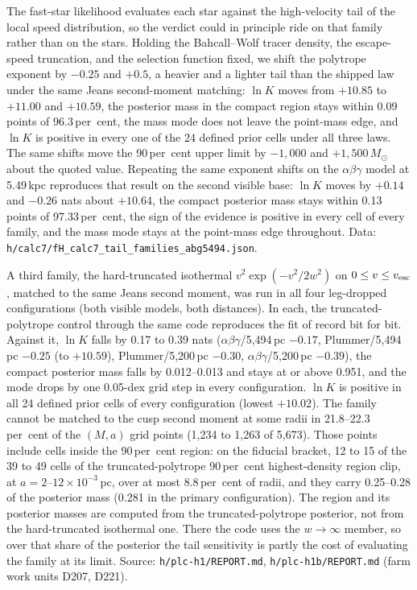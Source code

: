 \documentclass[11pt]{article}
\newcommand{\msun}{\ensuremath{M_\odot}}
\newcommand{\lnK}{\ensuremath{\ln K}}
\begin{document}
The fast-star likelihood evaluates each star against the high-velocity tail of the local speed distribution, so the verdict could in principle ride on that family rather than on the stars. Holding the Bahcall--Wolf tracer density, the escape-speed truncation, and the selection function fixed, we shift the polytrope exponent by $-0.25$ and $+0.5$, a heavier and a lighter tail than the shipped law under the same Jeans second-moment matching: $\lnK$ moves from $+10.85$ to $+11.00$ and $+10.59$, the posterior mass in the compact region stays within 0.09 points of 96.3\,per~cent, the mass mode does not leave the point-mass edge, and $\lnK$ is positive in every one of the 24 defined prior cells under all three laws. The same shifts move the 90\,per~cent upper limit by $-1{,}000$ and $+1{,}500\,\msun$ about the quoted value. Repeating the same exponent shifts on the $\alpha\beta\gamma$ model at 5.49\,kpc reproduces that result on the second visible base: $\lnK$ moves by $+0.14$ and $-0.26$ nats about $+10.64$, the compact posterior mass stays within 0.13 points of 97.33\,per~cent, the sign of the evidence is positive in every cell of every family, and the mass mode stays at the point-mass edge throughout. Data: \texttt{h/calc7/fH\_calc7\_tail\_families\_abg5494.json}.

A third family, the hard-truncated isothermal $v^{2}\exp(-v^{2}/2w^{2})$ on $0\le v\le v_{\rm esc}$, matched to the same Jeans second moment, was run in all four leg-dropped configurations (both visible models, both distances). In each, the truncated-polytrope control through the same code reproduces the fit of record bit for bit. Against it, $\lnK$ falls by 0.17 to 0.39 nats ($\alpha\beta\gamma$/5{,}494\,pc $-0.17$, Plummer/5{,}494\,pc $-0.25$ (to $+10.59$), Plummer/5{,}200\,pc $-0.30$, $\alpha\beta\gamma$/5{,}200\,pc $-0.39$), the compact posterior mass falls by 0.012--0.013 and stays at or above 0.951, and the mode drops by one 0.05-dex grid step in every configuration. $\lnK$ is positive in all 24 defined prior cells of every configuration (lowest $+10.02$). The family cannot be matched to the cusp second moment at some radii in 21.8--22.3\,per~cent of the $(M, a)$ grid points (1{,}234 to 1{,}263 of 5{,}673). Those points include cells inside the 90\,per~cent region: on the fiducial bracket, 12 to 15 of the 39 to 49 cells of the truncated-polytrope 90\,per~cent highest-density region clip, at $a = 2$--$12\times10^{-3}$\,pc, over at most 8.8\,per~cent of radii, and they carry 0.25--0.28 of the posterior mass (0.281 in the primary configuration). The region and its posterior masses are computed from the truncated-polytrope posterior, not from the hard-truncated isothermal one. There the code uses the $w\to\infty$ member, so over that share of the posterior the tail sensitivity is partly the cost of evaluating the family at its limit. Source: \texttt{h/plc-h1/REPORT.md}, \texttt{h/plc-h1b/REPORT.md} (farm work units D207, D221).
\end{document}
